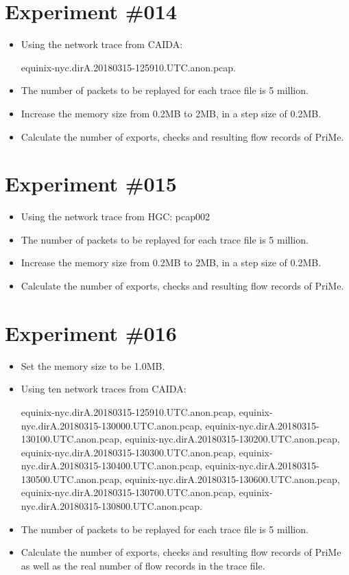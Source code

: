\documentclass[10pt, conference, letterpaper]{IEEEtran}
\begin{document}
\section*{Experiment \#014}
\begin{itemize}
	\item Using the network trace from CAIDA:
	
	equinix-nyc.dirA.20180315-125910.UTC.anon.pcap.
	\item The number of packets to be replayed for each trace file is 5 million.
	\item Increase the memory size from 0.2MB to 2MB, in a step size of 0.2MB.
	\item Calculate the number of exports, checks and resulting flow records of PriMe.
\end{itemize}

\section*{Experiment \#015}
\begin{itemize}
	\item Using the network trace from HGC: pcap002
	\item The number of packets to be replayed for each trace file is 5 million.
	\item Increase the memory size from 0.2MB to 2MB, in a step size of 0.2MB.
	\item Calculate the number of exports, checks and resulting flow records of PriMe.
\end{itemize}


\section*{Experiment \#016}
\begin{itemize}
	\item Set the memory size to be 1.0MB.
	\item Using ten network traces from CAIDA:
	
	equinix-nyc.dirA.20180315-125910.UTC.anon.pcap,
	equinix-nyc.dirA.20180315-130000.UTC.anon.pcap, 
	equinix-nyc.dirA.20180315-130100.UTC.anon.pcap, 
	equinix-nyc.dirA.20180315-130200.UTC.anon.pcap, 
	equinix-nyc.dirA.20180315-130300.UTC.anon.pcap, 
	equinix-nyc.dirA.20180315-130400.UTC.anon.pcap, 
	equinix-nyc.dirA.20180315-130500.UTC.anon.pcap, 
	equinix-nyc.dirA.20180315-130600.UTC.anon.pcap, 
	equinix-nyc.dirA.20180315-130700.UTC.anon.pcap, 
	equinix-nyc.dirA.20180315-130800.UTC.anon.pcap.
	\item The number of packets to be replayed for each trace file is 5 million.
	\item Calculate the number of exports, checks and resulting flow records of PriMe as well as the real number of flow records in the trace file.
\end{itemize}
\end{document}
